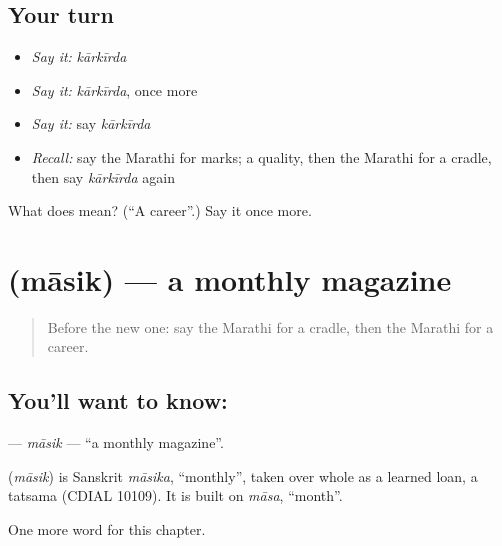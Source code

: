 \subsection*{Your turn}
\begin{itemize}
\raggedright
  \item \emph{Say it:} \emph{kārkīrda}
  \item \emph{Say it:} \emph{kārkīrda}, once more
  \item \emph{Say it:} say \emph{kārkīrda}
  \item \emph{Recall:} say the Marathi for marks; a quality, then the Marathi for a cradle, then say \emph{kārkīrda} again
\end{itemize}

\begin{tcolorbox}[breakable,colback=teal!4,colframe=teal!35!black,title={Before you move on}]
What does  mean? (\textquotedblleft{}A career\textquotedblright{}.) Say it once more.
\end{tcolorbox}
\section[\texorpdfstring{\mr{मासिक} (māsik)}{मासिक (māsik)}]{ (māsik) — a monthly magazine}

\label{lesson:MR-C222-masik}



\begin{quote}
Before the new one: say the Marathi for a cradle, then the Marathi for a career.
\end{quote}

\subsection*{You'll want to know: }
\textbf{} — \emph{māsik} — \textquotedblleft{}a monthly magazine\textquotedblright{}.

\begin{cousinweb}
\textbf{} (\emph{māsik}) is Sanskrit \emph{māsika}, \textquotedblleft{}monthly\textquotedblright{}, taken over whole as a learned loan, a tatsama (CDIAL 10109). It is built on \emph{māsa}, \textquotedblleft{}month\textquotedblright{}.
\end{cousinweb}

\begin{grammarlens}[title={What you've built}]
One more word for this chapter.
\end{grammarlens}


